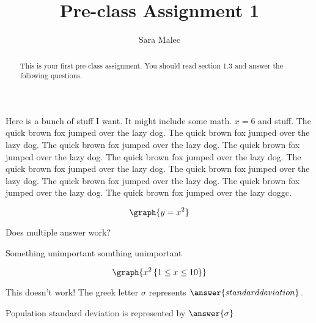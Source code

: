 \documentclass[handout, space]{ximera}
\title{Pre-class Assignment 1}
\author{Sara Malec}
\begin{document}
\begin{abstract}
  This is your first pre-class assignment. You should read section 1.3 and answer the following questions.
\end{abstract}
\maketitle

\begin{leash}{75}{50}
Here is a bunch of stuff I want. It might include some math. $x=6$ and stuff.
The quick brown fox jumped over the lazy dog.
The quick brown fox jumped over the lazy dog.
The quick brown fox jumped over the lazy dog.
The quick brown fox jumped over the lazy dog.
The quick brown fox jumped over the lazy dog.
The quick brown fox jumped over the lazy dog.
The quick brown fox jumped over the lazy dog.
The quick brown fox jumped over the lazy dog.
The quick brown fox jumped over the lazy dog.
The quick brown fox jumped over the lazy doggc.
\end{leash}


\begin{problem}

\[\graph{y=x^2}\]

\end{problem}

\begin{problem} Does multiple answer work?
\begin{selectAll}
\end{selectAll}
\end{problem}

\begin{problem}
\begin{foldable}
 Something unimportant  somthing
unimportant 
\end{foldable}
   \[ 
   \graph{x^2 \left\{ 1 \leq x \leq 10 \right\} }
   \]
\end{problem}

\begin{problem}


    This doesn't work!  The greek letter $\sigma$ represents $\answer{standard deviation}$.
\end{problem}

\begin{problem}
    Population standard deviation is represented by $\answer{\sigma}$
\end{problem}
\end{document}
